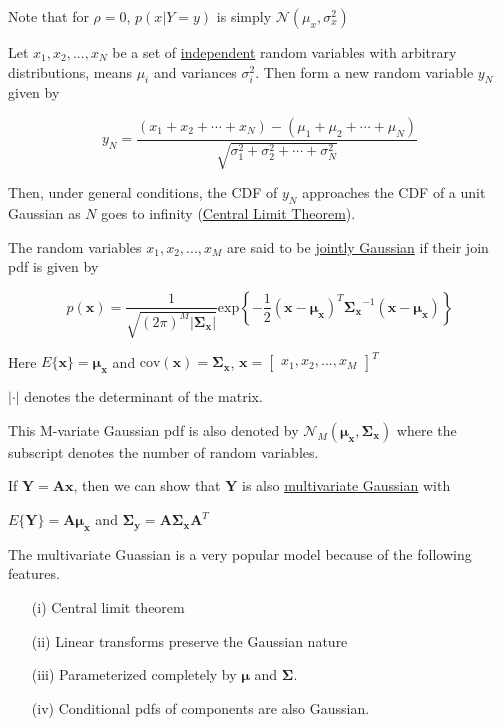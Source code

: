 \documentclass[fleqn]{article}
\begin{document}
	Note that for $\rho = 0$, $p(x|Y=y)$ is simply $\mathcal{N}(\mu_x,\sigma_x^2)$
		
	Let $x_1, x_2, ..., x_N$ be a set of \underline{independent} random variables with arbitrary distributions, means $\mu_i$ and variances $\sigma_i^2$. Then form a new random variable $y_N$ given by
		
	\begin{equation*}
		y_N = \frac{(x_1 + x_2 + \cdots + x_N) - (\mu_1 + \mu_2 + \cdots + \mu_N)}{\sqrt{\sigma_1^2 + \sigma_2^2 + \cdots + \sigma_N^2}}
	\end{equation*}
		
	Then, under general conditions, the CDF of $y_N$ approaches the CDF of a unit Gaussian as $N$ goes to infinity (\underline{Central Limit Theorem}).
		
	The random variables $x_1,x_2,...,x_M$ are said to be \underline{jointly Gaussian} if their join pdf is given by
		
	\begin{equation*}
		p(\mathbf{x}) = \frac{1}{\sqrt{(2\pi)^M|\mathbf{\Sigma_x}|}}\text{exp}\left\{-\frac{1}{2}(\mathbf{x} - \mathbf{\boldsymbol{\mu}_x})^T\mathbf{\Sigma_x}^{-1}(\mathbf{x} - \mathbf{\boldsymbol{\mu}_x})\right\}
	\end{equation*}
		
	Here $E\{\mathbf{x}\} = \mathbf{\boldsymbol{\mu}_x}$ and $\text{cov}(\mathbf{x}) = \mathbf{\Sigma_x}$, $\mathbf{x} = \begin{bmatrix}x_1,x_2,...,x_M\end{bmatrix}^T$
		
	$|\cdot|$ denotes the determinant of the matrix.
		
	This M-variate Gaussian pdf is also denoted by $\mathcal{N}_M(\mathbf{\boldsymbol{\mu}_x},\mathbf{\Sigma_x})$ where the subscript denotes the number of random variables.
		
	If $\mathbf{Y} = \mathbf{Ax}$, then we can show that $\mathbf{Y}$ is also \underline{multivariate Gaussian} with
		
	$E\{\mathbf{Y}\} = \mathbf{A\boldsymbol{\mu}_x}$ and $\mathbf{\Sigma_y} = \mathbf{A\Sigma_x}\mathbf{A}^T$
		
	The multivariate Guassian is a very popular model because of the following features.
		
	\begin{enumerate}
	
		\item[(i)] Central limit theorem
		
		\item[(ii)] Linear transforms preserve the Gaussian nature
		
		\item[(iii)] Parameterized completely by $\boldsymbol{\mu}$ and $\mathbf{\Sigma}$.
		
		\item[(iv)] Conditional pdfs of components are also Gaussian. 
		
	\end{enumerate}
	
\end{document}
